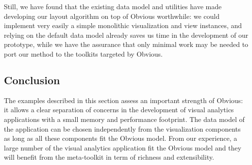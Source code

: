 Still, we have found that the existing data model and utilities have
made developing our layout algorithm on top of Obvious worthwhile: we
could implement very easily a simple monolithic visualization and
view instances, and relying on the default data model already saves us
time in the development of our prototype, while we have the assurance
that only minimal work may be needed to port our method to the
toolkits targeted by Obvious.


\subsection{Conclusion}

The examples described in this section assess an important strength of
Obvious: it allows a clear separation of concerns in the development
of visual analytics applications with a small memory and performance
footprint.  The data model of the application can be chosen
independently from the visualization components as long as all these
components fit the Obvious model.  From our experience, a large number
of the visual analytics application fit the Obvious model and they
will benefit from the meta-toolkit in term of richness and
extensibility.

